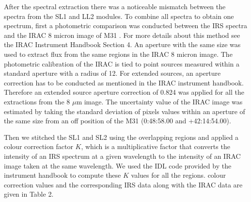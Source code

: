 After the spectral extraction there was a noticeable mismatch between the spectra from the SL1 and LL2 modules. To combine all spectra to obtain one spectrum, first a photometric comparison was conducted between the IRS spectra and the IRAC 8 micron image of M31 \citep{Barmby2006lr}. For more details about this method see the IRAC Instrument Handbook Section 4. An aperture with the same size was used to extract flux from the same regions in the IRAC 8 micron image. The photometric calibration of the IRAC is tied to point sources measured within a standard aperture with a radius of 12\arcsec. For extended sources,  an aperture correction has to be conducted as mentioned in the IRAC instrument handbook. Therefore an extended source aperture correction of 0.824 was applied for all the extractions from the 8 $\mu$m image. The uncertainty value of the IRAC image was estimated by taking the standard deviation of pixels values within an aperture of the same size from an off position of the M31 (0:48:58.00 and +42:14:54.00).

Then we stitched the SL1 and SL2 using the overlapping regions and applied a colour correction factor $K$, which is a multiplicative factor that converts the intensity of an IRS spectrum at a given wavelength to the intensity of an IRAC image taken at the same wavelength. We used the IDL code provided by the instrument handbook to compute these $K$ values for all the regions. colour correction values and the corresponding IRS data along with the IRAC data are given in Table 2.


